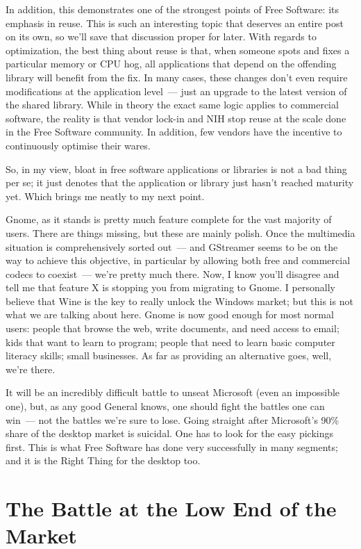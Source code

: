 \documentclass{memoir}
\begin{document}
In addition, this demonstrates one of the strongest points of Free
Software: its emphasis in reuse. This is such an interesting topic
that deserves an entire post on its own, so we'll save that discussion
proper for later. With regards to optimization, the best thing about
reuse is that, when someone spots and fixes a particular memory or CPU
hog, all applications that depend on the offending library will
benefit from the fix. In many cases, these changes don't even require
modifications at the application level~--- just an upgrade to the
latest version of the shared library. While in theory the exact same
logic applies to commercial software, the reality is that vendor
lock-in and NIH stop reuse at the scale done in the Free Software
community. In addition, few vendors have the incentive to continuously
optimise their wares.

So, in my view, bloat in free software applications or libraries is
not a bad thing per se; it just denotes that the application or
library just hasn't reached maturity yet. Which brings me neatly to my
next point.

Gnome, as it stands is pretty much feature complete for the vast
majority of users. There are things missing, but these are mainly
polish. Once the multimedia situation is comprehensively sorted out~---
and GStreamer seems to be on the way to achieve this objective, in
particular by allowing both free and commercial codecs to coexist~---
we're pretty much there. Now, I know you'll disagree and tell me that
feature X is stopping you from migrating to Gnome. I personally
believe that Wine is the key to really unlock the Windows market; but
this is not what we are talking about here. Gnome is now good enough
for most normal users: people that browse the web, write documents,
and need access to email; kids that want to learn to program; people
that need to learn basic computer literacy skills; small
businesses. As far as providing an alternative goes, well, we're
there.

It will be an incredibly difficult battle to unseat Microsoft (even an
impossible one), but, as any good General knows, one should fight the
battles one can win~--- not the battles we're sure to lose. Going
straight after Microsoft's 90\% share of the desktop market is
suicidal. One has to look for the easy pickings first. This is what
Free Software has done very successfully in many segments; and it is
the Right Thing for the desktop too.

\section{The Battle at the Low End of the Market}
\end{document}
